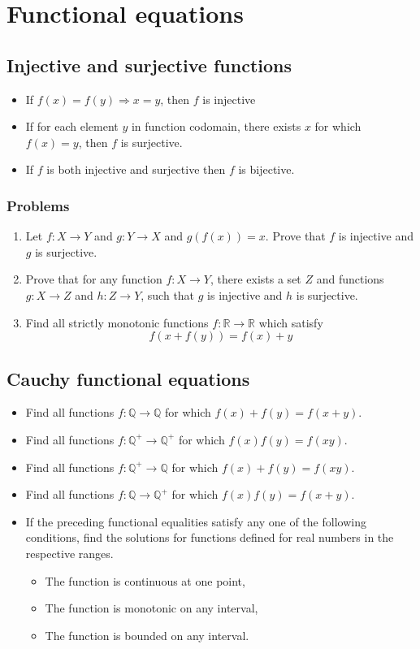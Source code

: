 \documentclass{article}
\begin{document}
\section*{Functional equations}

\subsection{Injective and surjective functions}
	\begin{itemize}
		\item 
		If $f(x)=f(y) \Rightarrow x=y$, then $f$ is injective
		\item 
		If for each element $y$ in function codomain, there exists $x$ for which $f(x)=y$, then $f$ is surjective.
		\item
		If $f$ is both injective and surjective then $f$ is bijective.
	\end{itemize}

	\subsubsection*{Problems}
		\begin{enumerate}
			\item
			Let $f: X \to Y$ and $g: Y \to X$ and $g(f(x))=x$. Prove that $f$ is injective and $g$ is surjective.
			\item 
			Prove that for any function $f: X \to Y$, there exists a set $Z$ and functions $g: X \to Z$ and $h: Z\to Y$, such that $g$ is injective and $h$ is surjective.
			\item 
			Find all strictly monotonic functions $f: \mathbb{R} \to \mathbb{R}$ which satisfy 
			$$f(x + f(y)) = f(x) + y$$
		\end{enumerate}

	\subsection{Cauchy functional equations}
		\begin{itemize}
			\item
			Find all functions $f: \mathbb{Q} \to \mathbb{Q}$ for which $f(x)+f(y)=f(x+y)$.
			\item
			Find all functions $f: \mathbb{Q^+} \to \mathbb{Q^+}$ for which $f(x)f(y)=f(xy)$.
			\item
			Find all functions $f: \mathbb{Q^+} \to \mathbb{Q}$ for which $f(x)+f(y)=f(xy)$.
			\item
			Find all functions $f: \mathbb{Q} \to \mathbb{Q^+}$ for which $f(x)f(y)=f(x+y)$.
			\item 
			If the preceding functional equalities satisfy any one of the following conditions, find the solutions for functions defined for real numbers in the respective ranges.
			\begin{itemize}
				\item The function is continuous at one point,
				\item The function is monotonic on any interval,
				\item The function is bounded on any interval.
			\end{itemize}
		\end{itemize}
\end{document}
